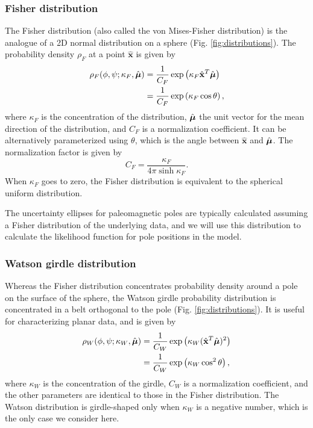 \documentclass[11pt,letterpaper]{article}
\newcommand{\mitbf}[1]{\hbox{\mathversion{bold}$#1$}}
\begin{document}
\subsubsection*{Fisher distribution}
The Fisher distribution (also called the von Mises-Fisher distribution) is the analogue of a 2D normal distribution on a sphere (Fig. \ref{fig:distributions}). The probability density $\rho_F$ at a point $\hat{\mathbf{x}}$ is given by
\begin{equation}
  \begin{aligned}
  \rho_F(\phi, \psi ; \kappa_F, \hat{\mitbf{\mu}}) 
  &= \frac{1}{C_F} \exp \left( \kappa_F \hat{\mathbf{x}}^T \hat{\mitbf{\mu}} \right) \\
  &= \frac{1}{C_F} \exp \left( \kappa_F \cos \theta \right),
  \end{aligned}
\end{equation}
where $\kappa_F$ is the concentration of the distribution, 
$\hat{\mitbf{\mu}}$ the unit vector for the mean direction of the distribution, and $C_F$ is a normalization coefficient. It can be alternatively parameterized using $\theta$, which is the angle between $\hat{\mathbf{x}}$ and $\hat{\mitbf{\mu}}$.
The normalization factor is given by 
\begin{equation}
  C_F = \frac{\kappa_F}{4 \pi \sinh{\kappa_F}}.
\end{equation}
When $\kappa_F$ goes to zero, the Fisher distribution is equivalent to the spherical uniform distribution.

The uncertainty ellipses for paleomagnetic poles are typically calculated assuming a Fisher distribution of the underlying data, and we will use this distribution to calculate the likelihood function for pole positions in the model.

\subsubsection*{Watson girdle distribution}
Whereas the Fisher distribution concentrates probability density around a pole on the surface of the sphere, the Watson girdle probability distribution is concentrated in a belt orthogonal to the pole (Fig. \ref{fig:distributions}). It is useful for characterizing planar data, and is given by
\begin{equation}
  \begin{aligned}
  \rho_W(\phi, \psi; \kappa_W, \hat{\mitbf{\mu}}) 
  &= \frac{1}{C_W} \exp \left( \kappa_W (\hat{\mathbf{x}}^T \hat{\mitbf{\mu}})^2 \right) \\
  &= \frac{1}{C_W} \exp \left( \kappa_W \cos^2 \theta \right),
  \end{aligned}
\label{eq:watson}
\end{equation}
where $\kappa_W$ is the concentration of the girdle, $C_W$ is a normalization coefficient, and the other parameters are identical to those in the Fisher distribution. The Watson distribution is girdle-shaped only when $\kappa_W$ is a negative number, which is the only case we consider here.
\end{document}
